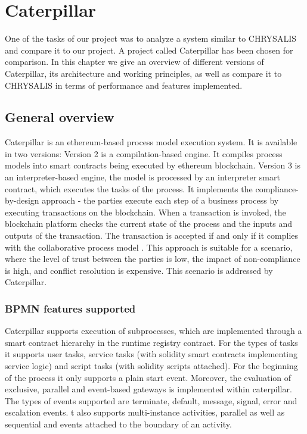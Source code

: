 %
\chapter{Caterpillar}
\label{sec:caterpillar}

One of the tasks of our project was to analyze a system similar to CHRYSALIS and compare it to our project. A project called Caterpillar has been chosen for comparison. In this chapter we give an overview of different versions of Caterpillar, its architecture and working principles, as well as compare it to CHRYSALIS in terms of performance and features implemented.

\section{General overview}
\label{sec:caterpillar:overview}

Caterpillar is an ethereum-based process model execution system. It is available in two versions: Version 2 is a compilation-based engine. It compiles process models into smart contracts being executed by ethereum blockchain. Version 3 is an interpreter-based engine, the model is processed by an interpreter smart contract, which executes the tasks of the process. It implements the compliance-by-design approach - the parties execute each step of a business process by executing transactions on the blockchain. When a transaction is invoked, the blockchain platform checks the current state of the process and the inputs and outputs of the transaction. The transaction is accepted if and only if it complies with the collaborative process model \cite{caterpillar}. This approach is suitable for a scenario, where the level of trust between the parties is low, the impact of non-compliance is high, and conflict resolution is expensive. This scenario is addressed by Caterpillar.

\subsection{BPMN features supported}
\label{sec:caterpillar:overview:bpmn}

Caterpillar supports execution of subprocesses, which are implemented through a smart contract hierarchy in the runtime registry contract. For the types of tasks it supports user tasks, service tasks (with solidity smart contracts implementing service logic) and script tasks (with solidity scripts attached). For the beginning of the process it only supports a plain start event. Moreover, the evaluation of exclusive, parallel and event-based gateways is implemented within caterpillar. The types of events supported are terminate, default, message, signal, error and escalation events. t also supports multi-instance activities, parallel as well as sequential and events attached to the boundary of an activity.

